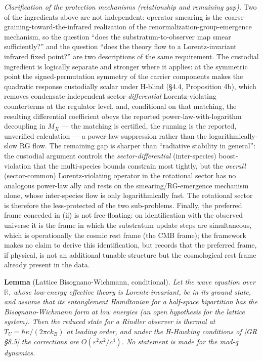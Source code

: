 \documentclass[
]{article}
\begin{document}
\emph{Clarification of the protection mechanisms (relationship and
remaining gap).} Two of the ingredients above are not independent:
operator smearing is the coarse-graining-toward-the-infrared realization
of the renormalization-group-emergence mechanism, so the question ``does
the substratum-to-observer map smear sufficiently?'' and the question
``does the theory flow to a Lorentz-invariant infrared fixed point?''
are two descriptions of the same requirement. The custodial ingredient
is logically separate and stronger where it applies: at the symmetric
point the signed-permutation symmetry of the carrier components makes
the quadratic response custodially scalar under H-blind (§4.4,
Proposition 4b), which removes condensate-independent
sector-\emph{differential} Lorentz-violating counterterms at the
regulator level, and, conditional on that matching, the resulting
differential coefficient obeys the reported power-law-with-logarithm
decoupling in \(M_X\) --- the matching is certified, the running is the
reported, unverified calculation --- a power-law suppression rather than
the logarithmically-slow RG flow. The remaining gap is sharper than
``radiative stability in general'': the custodial argument controls the
\emph{sector-differential} (inter-species) boost-violation that the
multi-species bounds constrain most tightly, but the \emph{overall}
(sector-common) Lorentz-violating operator in the rotational sector has
no analogous power-law ally and rests on the smearing/RG-emergence
mechanism alone, whose inter-species flow is only logarithmically fast.
The rotational sector is therefore the less-protected of the two
sub-problems. Finally, the preferred frame conceded in (ii) is not
free-floating: on identification with the observed universe it is the
frame in which the substratum update steps are simultaneous, which is
operationally the cosmic rest frame (the CMB frame); the framework makes
no claim to derive this identification, but records that the preferred
frame, if physical, is not an additional tunable structure but the
cosmological rest frame already present in the data.

\textbf{Lemma} (Lattice Bisognano-Wichmann, conditional). \emph{Let the
wave equation over \(\mathbb{R}\), whose low-energy effective theory is
Lorentz-invariant, be in its ground state, and assume that its
entanglement Hamiltonian for a half-space bipartition has the
Bisognano-Wichmann form at low energies (an open hypothesis for the
lattice system). Then the reduced state for a Rindler observer is
thermal at \(T_U = \hbar\kappa/(2\pi c k_B)\) at leading order, and
under the H-Hawking conditions of {[}GR §8.5{]} the corrections are
\(O(\varepsilon^2\kappa^2/c^4)\). No statement is made for the mod-q
dynamics.}
\end{document}
